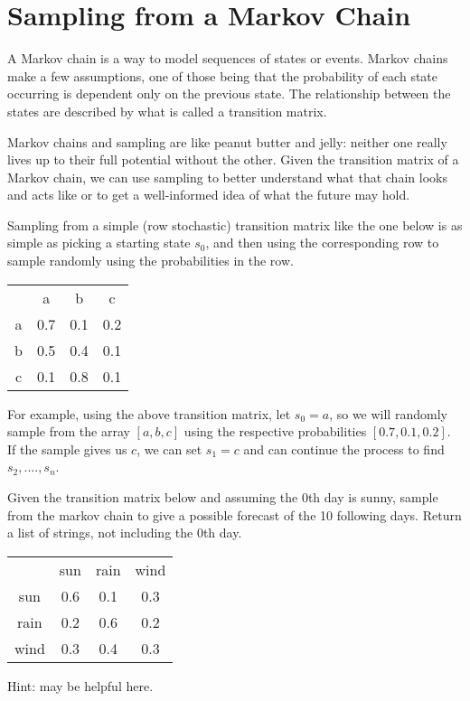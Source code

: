 \section*{Sampling from a Markov Chain}
A Markov chain is a way to model sequences of states or events.
Markov chains make a few assumptions, one of those being that the probability of each state occurring is dependent only on the previous state.
The relationship between the states are described by what is called a transition matrix.

Markov chains and sampling are like peanut butter and jelly: neither one really lives up to their full potential without the other.
Given the transition matrix of a Markov chain, we can use sampling to better understand what that chain looks and acts like or to get a well-informed idea of what the future may hold.

Sampling from a simple (row stochastic) transition matrix like the one below is as simple as picking a starting state $s_0$, and then using the corresponding row to sample randomly using the probabilities in the row.
\begin{center}
  \begin{tabular}{c c c c}
    & a & b & c\\
    a & 0.7 & 0.1 & 0.2\\
    b & 0.5 & 0.4 & 0.1\\
    c & 0.1 & 0.8 & 0.1
  \end{tabular}
\end{center}
For example, using the above transition matrix, let $s_0=a$, so we will randomly sample from the array $[a,b,c]$ using the respective probabilities $[0.7,0.1,0.2]$.
If the sample gives us $c$, we can set $s_1=c$ and can continue the process to find $s_2,....,s_n$.

\begin{problem}
Given the transition matrix below and assuming the 0th day is sunny, sample from the markov chain to give a possible forecast of the 10 following days.
Return a list of strings, not including the 0th day.
\begin{center}
  \begin{tabular}{c c c c}
    & sun & rain & wind\\
    sun & 0.6 & 0.1 & 0.3\\
    rain & 0.2 & 0.6 & 0.2\\
    wind & 0.3 & 0.4 & 0.3
  \end{tabular}
\end{center}
Hint:  may be helpful here.
\end{problem}

